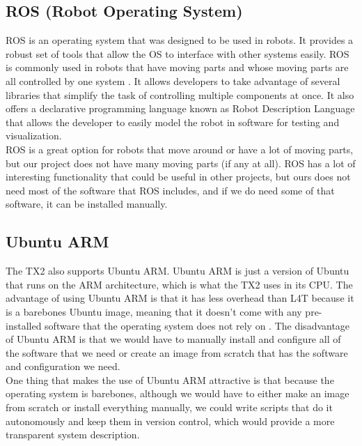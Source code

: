 \subsection{ROS (Robot Operating System)}
ROS is an operating system that was designed to be used in robots. It provides a robust set of tools that allow the OS to interface with other systems easily. ROS is commonly used in robots that have moving parts and whose moving parts are all controlled by one system \cite{introROS}. It allows developers to take advantage of several libraries that simplify the task of controlling multiple components at once. It also offers a declarative programming language known as Robot Description Language that allows the developer to easily model the robot in software for testing and visualization.\\

ROS is a great option for robots that move around or have a lot of moving parts, but our project does not have many moving parts (if any at all). ROS has a lot of interesting functionality that could be useful in other projects, but ours does not need most of the software that ROS includes, and if we do need some of that software, it can be installed manually.

\subsection{Ubuntu ARM}
The TX2 also supports Ubuntu ARM. Ubuntu ARM is just a version of Ubuntu that runs on the ARM architecture, which is what the TX2 uses in its CPU. The advantage of using Ubuntu ARM is that it has less overhead than L4T because it is a barebones Ubuntu image, meaning that it doesn't come with any pre-installed software that the operating system does not rely on \cite{ARM}. The disadvantage of Ubuntu ARM is that we would have to manually install and configure all of the software that we need or create an image from scratch that has the software and configuration we need.\\ 

One thing that makes the use of Ubuntu ARM attractive is that because the operating system is barebones, although we would have to either make an image from scratch or install everything manually, we could write scripts that do it autonomously and keep them in version control, which would provide a more transparent system description.

